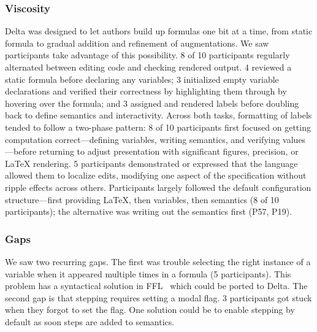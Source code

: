 \subsubsection{Viscosity}
Delta was designed to let authors build up formulas one bit at a time, from static formula to gradual addition and refinement of augmentations. We saw participants take advantage of this possibility. 8 of 10 participants regularly alternated between editing code and checking rendered output. 4 reviewed a static formula before declaring any variables; 3 initialized empty variable declarations and verified their correctness by highlighting them through by hovering over the formula; and 3 assigned and rendered labels before doubling back to define semantics and interactivity. Across both tasks, formatting of labels tended to follow a two-phase pattern: 8 of 10 participants first focused on getting computation correct---defining variables, writing semantics, and verifying values---before returning to adjust presentation with significant figures, precision, or LaTeX rendering. 5 participants demonstrated or expressed that the language allowed them to localize edits, modifying one aspect of the specification without ripple effects across others. Participants largely followed the default configuration structure---first providing LaTeX, then variables, then semantics (8 of 10 participants); the alternative was writing out the semantics first (P57, P19). 

\subsubsection{Gaps}\label{design-gaps} 

We saw two recurring gaps. The first was trouble selecting the right instance of a variable when it appeared multiple times in a formula (5 participants). This problem has a syntactical solution in FFL~\cite{Wu2023-xc} which could be ported to Delta. The second gap is that  stepping requires setting a modal flag. 3 participants got stuck when they forgot to set the flag. One solution could be to enable stepping by default as soon steps are added to semantics.